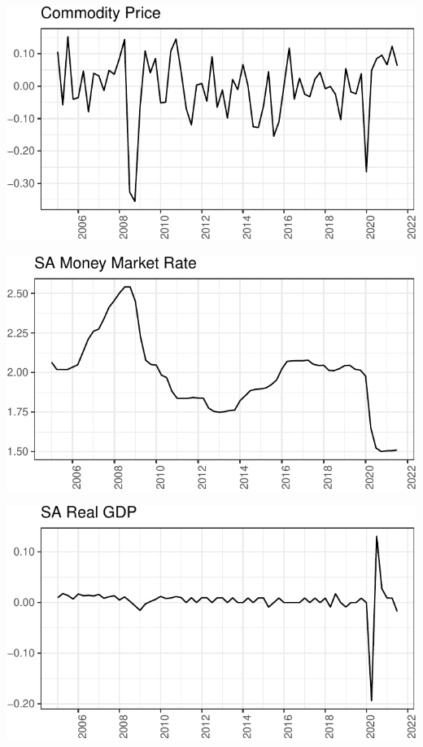 \documentclass[11pt,preprint, authoryear]{elsarticle}
\let\origfigure\figure
\let\endorigfigure\endfigure
\renewenvironment{figure}[1][2] {
    \expandafter\origfigure\expandafter[H]
} {
    \endorigfigure
}
\numberwithin{equation}{section}
\numberwithin{figure}{section}
\numberwithin{table}{section}
\begin{document}
\begin{figure}[H]
\includegraphics{Factor-Model_files/figure-latex/unnamed-chunk-6-1} \caption{Bloomberg Commodity Price Index \label{Fig4}}\label{fig:unnamed-chunk-6}
\end{figure}

\begin{figure}[H]
\includegraphics{Factor-Model_files/figure-latex/unnamed-chunk-7-1} \caption{South Africa Money Market Rate \label{Fig5}}\label{fig:unnamed-chunk-7}
\end{figure}

\begin{figure}[H]
\includegraphics{Factor-Model_files/figure-latex/unnamed-chunk-8-1} \caption{South Africa Real GDP \label{Fig6}}\label{fig:unnamed-chunk-8}
\end{figure}
\end{document}
